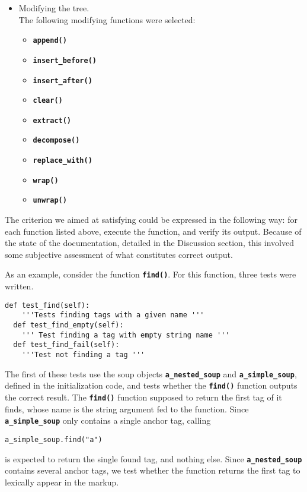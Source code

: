 \documentclass[10pt]{article}
\newcommand{\tbt}[1]{\texttt{\textbf{#1}}}
\begin{document}
\begin{itemize}
  \item Modifying the tree. \\
  The following modifying functions were selected:
    \begin{itemize}
    \setlength\itemsep{-0.05em}
      \item \tbt{append()}
      \item \tbt{insert\_before()}
      \item \tbt{insert\_after()}
      \item \tbt{clear()}
      \item \tbt{extract()}
      \item \tbt{decompose()}
      \item \tbt{replace\_with()}
      \item \tbt{wrap()}
      \item \tbt{unwrap()}
    \end{itemize}
\end{itemize}

The criterion we aimed at satisfying could be expressed in the following way: for each function listed above, execute the function, and verify its output. Because of the state of the documentation, detailed in the Discussion section, this involved some subjective assessment of what constitutes correct output. 

As an example, consider the function \tbt{find()}. For this function, three tests were written.
\begin{lstlisting}[style = pythonstyle]
  def test_find(self):
    '''Tests finding tags with a given name '''
  def test_find_empty(self):
    ''' Test finding a tag with empty string name '''
  def test_find_fail(self):
    '''Test not finding a tag '''
\end{lstlisting}

The first of these tests use the soup objects \tbt{a\_nested\_soup} and \tbt{a\_simple\_soup}, defined in the initialization code, and tests whether the \tbt{find()} function outputs the correct result. The \tbt{find()} function supposed to return the first tag of it finds, whose name is the string argument fed to the function. Since \tbt{a\_simple\_soup} only contains a single anchor tag, calling
\begin{lstlisting}[style = pythonstyle]
a_simple_soup.find("a")
\end{lstlisting}
is expected to return the single found tag, and nothing else. Since \tbt{a\_nested\_soup} contains several anchor tags, we test whether the function returns the first tag to lexically appear in the markup. \\
\end{document}
